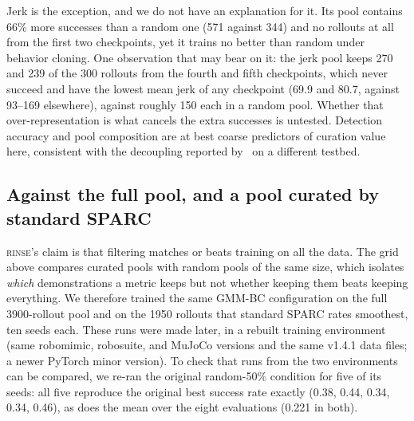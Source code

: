 \documentclass[10pt]{article}
\newcommand{\rinse}{\textmd{\textsc{rinse}}}
\begin{document}
Jerk is the exception, and we do not have an explanation for it. Its pool
contains 66\% more successes than a random one (571 against 344) and no
rollouts at all from the first two checkpoints, yet it trains no better than
random under behavior cloning. One observation that may bear on it: the
jerk pool keeps 270 and 239 of the 300 rollouts from the fourth and fifth
checkpoints, which never succeed and have the lowest mean jerk of any
checkpoint (69.9 and 80.7, against 93--169 elsewhere), against roughly 150 each
in a random pool. Whether that over-representation is what cancels the extra
successes is untested. Detection accuracy and pool composition are at best
coarse predictors of curation value here, consistent with the decoupling
reported by~\citep{bedi-policy} on a different testbed.

\subsection{Against the full pool, and a pool curated by standard SPARC}
\label{sec:fullpool}

\rinse{}'s claim is that filtering matches or beats training on all the
data. The grid above compares curated pools with random pools of the same
size, which isolates \emph{which} demonstrations a metric keeps but not
whether keeping them beats keeping everything. We therefore trained the
same GMM-BC configuration on the full 3900-rollout pool and on the 1950
rollouts that standard SPARC rates smoothest, ten seeds each. These runs
were made later, in a rebuilt training environment (same robomimic,
robosuite, and MuJoCo versions and the same v1.4.1 data files; a newer
PyTorch minor version). To check that runs from the two environments can be
compared, we re-ran the original random-50\% condition for five of its
seeds: all five reproduce the original best success rate exactly (0.38,
0.44, 0.34, 0.34, 0.46), as does the mean over the eight evaluations (0.221
in both).
\end{document}
